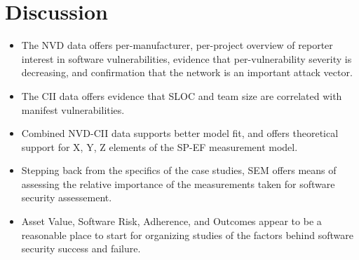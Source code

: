 \section{Discussion}
\label{sec:discussion}

\begin{itemize}
	\item The NVD data offers per-manufacturer, per-project overview of reporter interest in software vulnerabilities, evidence that per-vulnerability severity is decreasing, and confirmation that the network is an important attack vector.
	\item The CII data offers evidence that SLOC and team size are correlated with manifest vulnerabilities. 
	\item Combined NVD-CII data supports better model fit, and offers theoretical support for X, Y, Z elements of the SP-EF measurement model. 
	\item Stepping back from the specifics of the case studies, SEM offers means of assessing the relative importance of the measurements taken for software security assessement.
	\item Asset Value, Software Risk, Adherence, and Outcomes appear to be a reasonable place to start for organizing studies of the factors behind software security success and failure. 
\end{itemize}